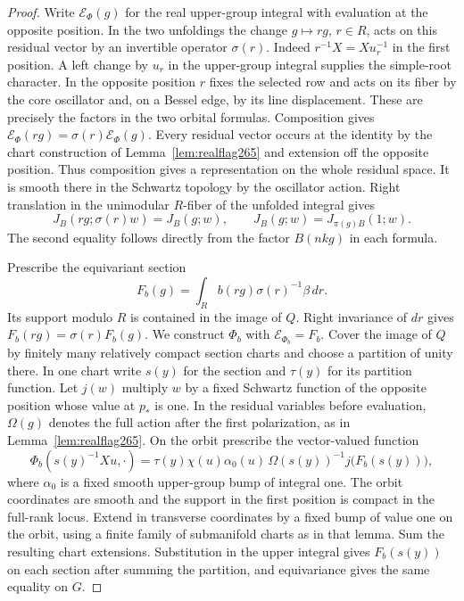 \documentclass[a4paper,11pt]{article}
\theoremstyle{definition}
\theoremstyle{remark}
\numberwithin{equation}{section}
\begin{document}
\begin{proof}
Write \(\mathcal E_\Phi(g)\) for the real upper-group integral
with evaluation at the opposite position. In the two
unfoldings the change \(g\mapsto r g\), \(r\in R\), acts
on this residual vector by an invertible operator \(\sigma(r)\).
Indeed \(r^{-1}X=Xu_r^{-1}\) in the first position. A left
change by \(u_r\) in the upper-group integral supplies the
simple-root character. In the opposite position \(r\) fixes
the selected row and acts on its fiber by the core oscillator
and, on a Bessel edge, by its line displacement. These are
precisely the factors in the two orbital formulas. Composition
gives \(\mathcal E_\Phi(rg)=\sigma(r)\mathcal E_\Phi(g)\).
Every residual vector occurs at the identity by the chart
construction of Lemma~\ref{lem:realflag265} and extension off
the opposite position. Thus composition gives a representation
on the whole residual space. It is smooth there in the
Schwartz topology by the oscillator action. Right translation
in the unimodular \(R\)-fiber of the unfolded integral gives
\[
 J_B(rg;\sigma(r)w)=J_B(g;w),\qquad
 J_B(g;w)=J_{\pi(g)B}(1;w).
\]
The second equality follows directly from the factor \(B(nkg)\)
in each formula.

Prescribe the equivariant section
\[
           F_b(g)=\int_R b(rg)\sigma(r)^{-1}\beta\,dr .
\]
Its support modulo \(R\) is contained in the image of \(Q\).
Right invariance of \(dr\) gives \(F_b(rg)=\sigma(r)F_b(g)\).
We construct \(\Phi_b\) with \(\mathcal E_{\Phi_b}=F_b\).
Cover the image of \(Q\) by finitely many relatively compact
section charts and choose a partition of unity there. In one
chart write \(s(y)\) for the section and \(\tau(y)\) for its
partition function. Let \(j(w)\) multiply \(w\) by a fixed
Schwartz function of the opposite position whose value at
\(p_*\) is one. In the residual variables before evaluation,
\(\Omega(g)\) denotes the full action after the first
polarization, as in Lemma~\ref{lem:realflag265}. On the
orbit prescribe the vector-valued function
\[
 \Phi_b(s(y)^{-1}Xu,\cdot)=
   \tau(y)\chi(u)\alpha_0(u)\,
          \Omega(s(y))^{-1}j\big(F_b(s(y))\big),
\]
where \(\alpha_0\) is a fixed smooth upper-group bump of
integral one. The orbit coordinates are smooth and the
support in the first position is compact in the full-rank
locus. Extend in transverse coordinates by a fixed bump of
value one on the orbit, using a finite family of submanifold
charts as in that lemma. Sum the resulting chart extensions.
Substitution in the upper integral gives \(F_b(s(y))\) on
each section after summing the partition, and equivariance
gives the same equality on \(G\).


\end{proof}
\end{document}
